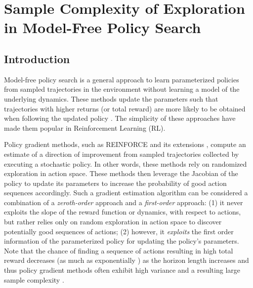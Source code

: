 
\chapter{Sample Complexity of Exploration in Model-Free Policy Search}
\label{cha:sample-compl-expl}

\section{Introduction}
Model-free policy search is a general approach to learn parameterized
policies from sampled trajectories in the environment without
learning a model of the underlying dynamics. These methods
update the parameters such that trajectories with higher returns (or total reward) are
more likely to be obtained when following the updated policy
\citep{kober2013reinforcement}. The simplicity of these approaches have
made them popular in Reinforcement Learning (RL).

Policy gradient methods, such as REINFORCE \citep{williams1992simple}
and its extensions \citep{kakade2002natural,bagnell2004policy, silver2014deterministic,schulman2015trust},
compute an estimate of a direction of improvement from sampled
trajectories collected by executing a stochastic policy. In other words, these methods rely on
randomized exploration in action space. These methods then leverage
the Jacobian of the policy to update its parameters to increase the
probability of good action sequences accordingly. Such a gradient
estimation algorithm can be considered a combination of a
\textit{zeroth-order} approach and a \textit{first-order} approach:
(1) it never exploits the slope of the reward function or dynamics,
with respect to actions, but rather relies only on random exploration
in action space to discover potentially good sequences of actions; (2)
however, it \emph{exploits} the first order information of the
parameterized policy for updating the policy's parameters. Note that
the chance of finding a sequence of actions resulting in high total
reward decreases (as much as exponentially
\citep{kakade2002approximately}) as the horizon length increases and
thus policy gradient methods often exhibit high variance and a
resulting large sample complexity \citep{peters2008reinforcement,
  zhao2011analysis}.

